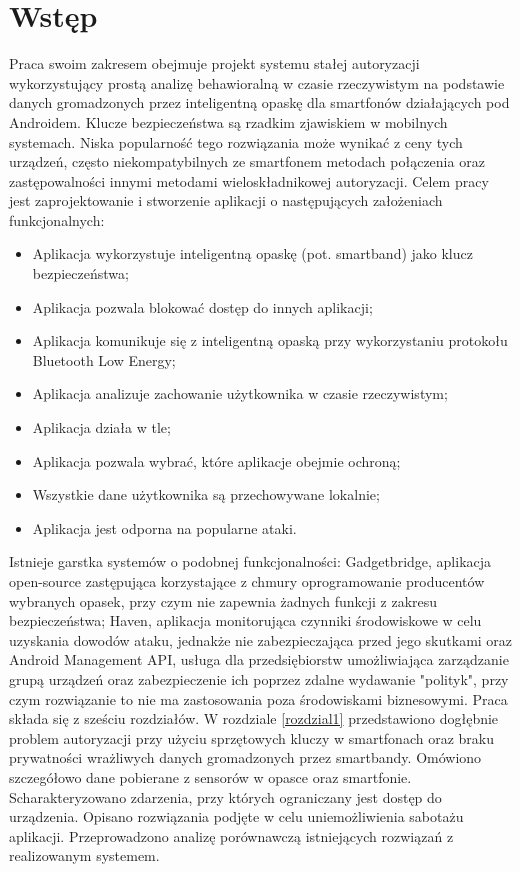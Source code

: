 \chapter{Wstęp}
\thispagestyle{chapterBeginStyle}
\label{wstep}

Praca swoim zakresem obejmuje projekt systemu stałej autoryzacji wykorzystujący prostą analizę behawioralną w czasie rzeczywistym na 
podstawie danych gromadzonych przez inteligentną opaskę dla smartfonów działających pod Androidem. Klucze bezpieczeństwa są rzadkim zjawiskiem w 
mobilnych systemach. Niska popularność tego rozwiązania może wynikać z ceny tych urządzeń, często niekompatybilnych ze smartfonem metodach połączenia oraz 
zastępowalności innymi metodami wieloskładnikowej autoryzacji.
\newline\newline
\indent Celem pracy jest zaprojektowanie i stworzenie aplikacji o następujących założeniach funkcjonalnych: 
\begin{itemize}
	\item Aplikacja wykorzystuje inteligentną opaskę (pot. smartband) jako klucz bezpieczeństwa;
	\item Aplikacja pozwala blokować dostęp do innych aplikacji;
    \item Aplikacja komunikuje się z inteligentną opaską przy wykorzystaniu protokołu Bluetooth Low Energy;
    \item Aplikacja analizuje zachowanie użytkownika w czasie rzeczywistym;
    \item Aplikacja działa w tle;
    \item Aplikacja pozwala wybrać, które aplikacje obejmie ochroną;
    \item Wszystkie dane użytkownika są przechowywane lokalnie;
    \item Aplikacja jest odporna na popularne ataki.
\end{itemize}

\indent Istnieje garstka systemów o podobnej funkcjonalności: Gadgetbridge, aplikacja open-source zastępująca korzystające z chmury oprogramowanie producentów wybranych opasek, przy czym nie zapewnia żadnych funkcji z zakresu bezpieczeństwa; Haven, aplikacja monitorująca czynniki środowiskowe w celu 
uzyskania dowodów ataku, jednakże nie zabezpieczająca przed jego skutkami oraz Android Management API, usługa dla przedsiębiorstw umożliwiająca zarządzanie grupą urządzeń oraz zabezpieczenie ich poprzez zdalne wydawanie "polityk", przy czym rozwiązanie to nie ma zastosowania poza środowiskami biznesowymi.
\newline\newline
\indent Praca składa się z sześciu rozdziałów. W rozdziale \ref{rozdzial1} przedstawiono dogłębnie problem autoryzacji przy użyciu sprzętowych kluczy w smartfonach oraz braku prywatności wrażliwych danych gromadzonych przez smartbandy. 
Omówiono szczegółowo dane pobierane z sensorów w opasce oraz smartfonie. Scharakteryzowano zdarzenia, przy których ograniczany jest dostęp do 
urządzenia. Opisano rozwiązania podjęte w celu uniemożliwienia sabotażu aplikacji. Przeprowadzono analizę porównawczą istniejących rozwiązań z realizowanym 
systemem.

